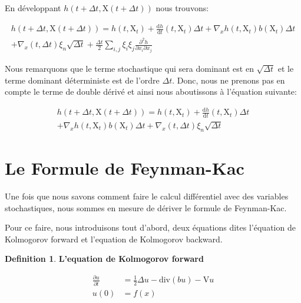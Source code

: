 \documentclass[11pt]{article}
\theoremstyle{definition}
\newtheorem{definition}{Definition}[section]
\theoremstyle{remark}
\begin{document}
En développant $h(t+\Delta t, \mathrm{X}(t+\Delta t))$ nous trouvons:

\begin{multline}
h(t+\Delta t, \mathrm{X}(t+\Delta t)) = h(t, \mathrm{X}_{t}) + \frac{\mathrm{d}h}{\mathrm{d}t}(t,\mathrm{X}_{t})\Delta t + \nabla_{x} h(t, \mathrm{X}_{t})  b(\mathrm{X}_{t}) \Delta t \\
+ \nabla_{x} (t, \Delta t) \xi_{n} \sqrt{\Delta t} + \frac{\Delta t}{2} \sum_{i,j} \xi_{i} \xi_{j} \frac{\partial^2 h}{\partial x_i \partial x_j}
\end{multline}

Nous remarquons que le terme stochastique qui sera dominant est en $\sqrt{\Delta t}$ et le terme dominant déterministe est de l'ordre $\Delta t$. Donc, nous ne prenons pas en compte le terme de double dérivé et ainsi nous aboutissons à l’équation suivante:

\begin{multline}
\label{h_final}
h(t+\Delta t, \mathrm{X}(t+\Delta t)) = h(t, \mathrm{X}_{t}) + \frac{\mathrm{d}h}{\mathrm{d}t}(t,\mathrm{X}_{t})\Delta t \\ + \nabla_{x} h(t, \mathrm{X}_{t})  b(\mathrm{X}_{t}) \Delta t + \nabla_{x} (t, \Delta t) \xi_{n} \sqrt{\Delta t}
\end{multline}

\section{Le Formule de Feynman-Kac}

Une fois que nous savons comment faire le calcul différentiel avec des variables stochastiques, nous sommes en mesure de dériver le formule de Feynman-Kac. 

Pour ce faire, nous introduisons tout d'abord, deux équations dites l’équation de Kolmogorov forward et l'equation de Kolmogorov backward. 

\begin{definition}{\textbf{L'equation de Kolmogorov forward}}

\begin{equation}
\label{kolmo_forw}
\begin{split}
\frac{\partial u}{\partial t} &= \frac{1}{2} \Delta u - \mathrm{div}(bu) - \mathrm{V}u \\
u(0) &= f(x)
\end{split}
\end{equation}

\end{definition}
\end{document}
